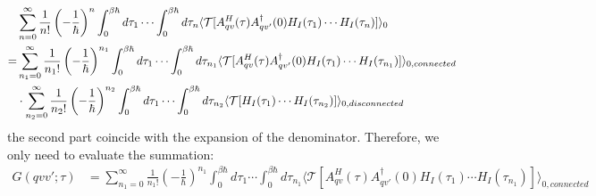 \documentclass{article}
\begin{document}
\begin{align}
    &\sum_{n=0}^{\infty} \frac{1}{n!} \left( -\frac{1}{\hbar} \right)^n 
    \int_0^{\beta\hbar} d\tau_1 \cdots \int_0^{\beta\hbar} d\tau_n \langle \mathcal{T}[ A^H_{qv}(\tau) A_{qv'}^{\dagger}(0) H_I(\tau_1) \cdots H_I(\tau_n) ] \rangle_0  \notag \\
      = &\sum_{n_1=0}^{\infty} \frac{1}{n_1!} \left( -\frac{1}{\hbar} \right)^{n_1} 
      \int_0^{\beta\hbar} d\tau_1 \cdots \int_0^{\beta\hbar} d\tau_{n_1} \langle \mathcal{T}[ A^H_{qv}(\tau) A_{qv'}^{\dagger}(0) H_I(\tau_1) \cdots H_I(\tau_{n_1}) ]\rangle_{0,connected} \notag \\
      & \cdot \sum_{n_2=0}^{\infty} \frac{1}{n_2!} \left( -\frac{1}{\hbar} \right)^{n_2} 
      \int_0^{\beta\hbar} d\tau_1 \cdots \int_0^{\beta\hbar} d\tau_{n_2} \langle \mathcal{T}[ H_I(\tau_1) \cdots H_I(\tau_{n_2}) ] \rangle_{0,disconnected}
\end{align}
the second part coincide with the expansion of the denominator. Therefore, we only need to evaluate the summation:
\begin{align}
    G(qvv';\tau)&= \sum_{n_1=0}^{\infty} \frac{1}{n_1!} \left( -\frac{1}{\hbar} \right)^{n_1} 
    \int_0^{\beta\hbar} d\tau_1 \cdots \int_0^{\beta\hbar} d\tau_{n_1} \langle \mathcal{T}[ A^H_{qv}(\tau) A_{qv'}^{\dagger}(0) H_I(\tau_1) \cdots H_I(\tau_{n_1}) ]\rangle_{0,connected}
\end{align}
\end{document}
